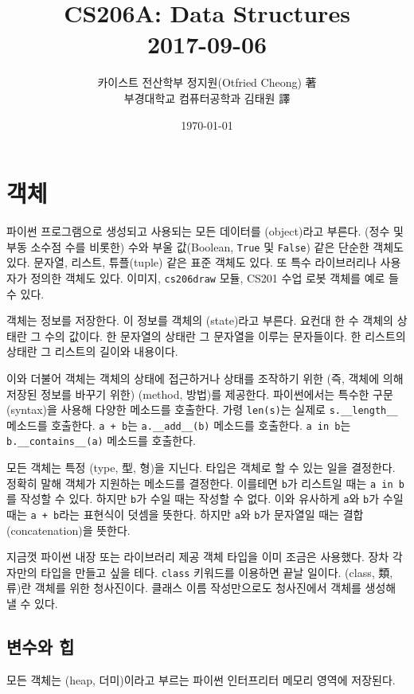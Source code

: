 \documentclass[a4paper]{oblivoir}
\title{CS206A: Data Structures\\2017-09-06}
\author{카이스트 전산학부 정지원(Otfried Cheong) 著\\부경대학교 컴퓨터공학과 김태원 譯}
\date{\today}
\begin{document}
\maketitle

\section*{객체}

파이썬 프로그램으로 생성되고 사용되는 모든 데이터를 (object)라고 부른다. (정수 및 부동 소수점 수를 비롯한) 수와 부울 값(Boolean, \texttt{True} 및 \texttt{False}) 같은 단순한 객체도 있다. 문자열, 리스트, 튜플(tuple) 같은 표준 객체도 있다. 또 특수 라이브러리나 사용자가 정의한 객체도 있다. 이미지, \texttt{cs206draw} 모듈, CS201 수업 로봇 객체를 예로 들 수 있다.

객체는 정보를 저장한다. 이 정보를 객체의 (state)라고 부른다. 요컨대 한 수 객체의 상태란 그 수의 값이다. 한 문자열의 상태란 그 문자열을 이루는 문자들이다. 한 리스트의 상태란 그 리스트의 길이와 내용이다.

이와 더불어 객체는 객체의 상태에 접근하거나 상태를 조작하기 위한 (즉, 객체에 의해 저장된 정보를 바꾸기 위한) (method, 방법)를 제공한다. 파이썬에서는 특수한 구문(syntax)을 사용해 다양한 메소드를 호출한다. 가령 \texttt{len(s)}는 실제로 \texttt{s.\_\_length\_\_} 메소드를 호출한다. \texttt{a + b}는 \texttt{a.\_\_add\_\_(b)} 메소드를 호출한다. \texttt{a in b}는 \texttt{b.\_\_contains\_\_(a)} 메소드를 호출한다.

모든 객체는 특정 (type, 型, 형)을 지닌다. 타입은 객체로 할 수 있는 일을 결정한다. 정확히 말해 객체가 지원하는 메소드를 결정한다. 이를테면 \texttt{b}가 리스트일 때는 \texttt{a in b}를 작성할 수 있다. 하지만 \texttt{b}가 수일 때는 작성할 수 없다. 이와 유사하게 \texttt{a}와 \texttt{b}가 수일 때는 \texttt{a + b}라는 표현식이 덧셈을 뜻한다. 하지만 \texttt{a}와 \texttt{b}가 문자열일 때는 결합(concatenation)을 뜻한다. 

지금껏 파이썬 내장 또는 라이브러리 제공 객체 타입을 이미 조금은 사용했다. 장차 각자만의 타입을 만들고 싶을 테다. \texttt{class} 키워드를 이용하면 끝날 일이다. (class, 類, 류)란 객체를 위한 청사진이다. 클래스 이름 작성만으로도 청사진에서 객체를 생성해 낼 수 있다.

\subsection*{변수와 힙}

모든 객체는 (heap, 더미)이라고 부르는 파이썬 인터프리터 메모리 영역에 저장된다.
\end{document}
